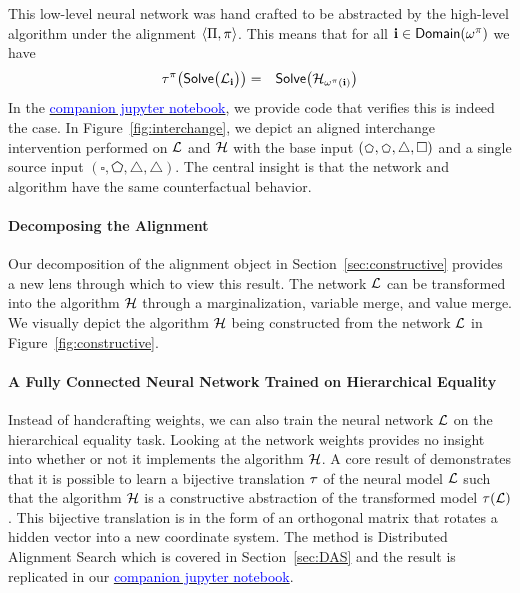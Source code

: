 \documentclass[twoside,11pt]{article}
\begin{document}
This low-level neural network was hand crafted to be abstracted by the high-level algorithm under the alignment $\langle \Pi, \pi \rangle$. This means that for all $\mathbf{i} \in \mathsf{Domain}(\omega^{\pi})$ we have
\begin{eqnarray}\tau^{\pi}\big(\mathsf{Solve}\big(\mathcal{L}_{\mathbf{i}}\big)\big)  & = & \mathsf{Solve}\big(\mathcal{H}_{{\omega^{\pi}}(\mathbf{i})}\big)\label{eq:networkalg}\end{eqnarray} 
In the 
\href{https://github.com/stanfordnlp/pyvene/blob/main/tutorials/advanced_tutorials/DAS_Main_Introduction.ipynb}{\textcolor{blue}{companion jupyter notebook}}, we provide code that verifies this is indeed the case. In Figure~\ref{fig:interchange}, we depict an aligned interchange intervention performed on $\mathcal{L}$ and $\mathcal{H}$ with the base input $(\pentagon, \pentagon, \bigtriangleup, \square \normalsize)$ and a single source input $(\square, \pentagon, \bigtriangleup, \bigtriangleup)$. The central insight is that the network and algorithm have the same counterfactual behavior.

\paragraph{Decomposing the Alignment}\label{ex:alignment} 
Our decomposition of the alignment object in Section~\ref{sec:constructive} provides a new lens through which to view this result. The network $\mathcal{L}$ can be transformed into the algorithm $\mathcal{H}$ through a marginalization, variable merge, and value merge. We visually depict the algorithm $\mathcal{H}$ being constructed from the network $\mathcal{L}$ in Figure~\ref{fig:constructive}. 



\paragraph{A Fully Connected Neural Network Trained on Hierarchical Equality}
Instead of handcrafting weights, we can also train the neural network $\mathcal{L}$ on the hierarchical equality task. Looking at the network weights provides no insight into whether or not it implements the algorithm $\mathcal{H}$. A core result of \cite{Geiger-etal:2023:DAS} demonstrates that it is possible to learn a bijective translation $\tau$ of the neural model $\mathcal{L}$ such that the algorithm $\mathcal{H}$ is a constructive abstraction of the transformed model $\tau(\mathcal{L})$. This bijective translation is in the form of an orthogonal matrix that rotates a hidden vector into a new coordinate system. The method is Distributed Alignment Search which is covered in Section~\ref{sec:DAS} and the result is replicated in our \href{https://github.com/stanfordnlp/pyvene/blob/main/tutorials/advanced_tutorials/DAS_Main_Introduction.ipynb}{\textcolor{blue}{companion jupyter notebook}}.
\end{document}
